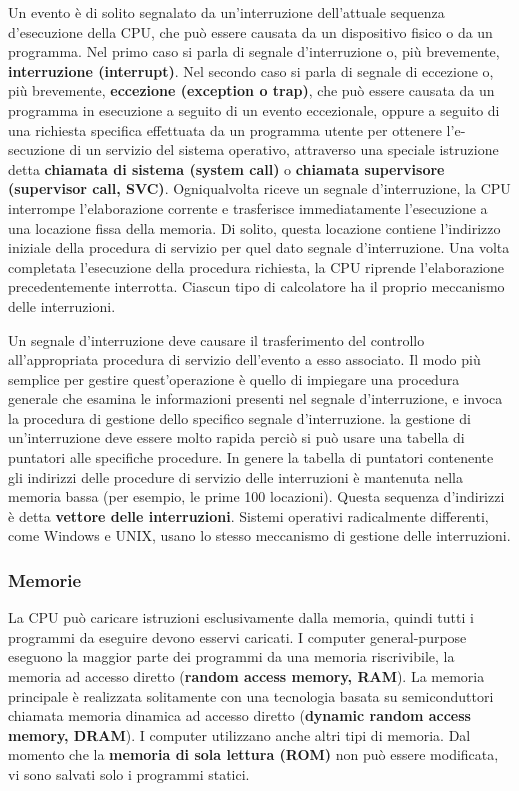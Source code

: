 \documentclass[11pt,a4paper]{article}
\begin{document}
Un evento è di solito segnalato da un'interruzione dell'attuale sequenza d'esecuzione
della CPU, che può essere causata da un dispositivo fisico o da un programma. Nel primo
ca­so si parla di segnale d'interruzione o, più brevemente, \textbf{interruzione (interrupt)}.
Nel secondo caso si parla di segnale di eccezione
o, più brevemente, \textbf{eccezione (exception o trap)}, che può essere causata da un programma in
esecuzione a seguito di un evento eccezionale,
op­pure a seguito di una richiesta specifica effettuata da un programma utente per ottenere
l'e­secuzione di un servizio del sistema operativo, attraverso una speciale istruzione detta
\textbf{chia­mata di sistema (system call)} o \textbf{chiamata supervisore (supervisor call, SVC)}.
Ogniqualvolta riceve un segnale d'interruzione, la CPU interrompe l'elaborazione
cor­rente e trasferisce immediatamente l'esecuzione a una locazione fissa della memoria. Di
so­lito, questa locazione contiene l'indirizzo iniziale della procedura di servizio per quel dato
segnale d'interruzione. Una volta completata l'esecuzione della procedura richiesta, la CPU
riprende l'elaborazione precedentemente interrotta. Ciascun tipo di calcolatore ha il proprio meccanismo delle interruzioni.

Un segnale d'interruzione deve causare il trasferimento
del controllo all'appropriata procedura di servizio dell'evento a esso associato. Il modo più
semplice per gestire quest'operazione è quello di impiegare una procedura generale che
esa­mina le informazioni presenti nel segnale d'interruzione, e invoca la procedura di gestione
dello specifico segnale d'interruzione. la gestione di un'interruzione deve
esse­re molto rapida perciò si può usare una tabella di puntatori alle specifiche procedure.
In genere la tabella di puntatori
contenen­te gli indirizzi delle procedure di servizio delle interruzioni è mantenuta nella memoria
bas­sa (per esempio, le prime 100 locazioni). Questa sequenza d'indirizzi è detta
\textbf{vetto­re delle interruzioni}. Sistemi operativi radicalmente differenti, come Windows e
UNIX, usano lo stesso meccanismo di gestione delle interruzioni.

\subsubsection{Memorie}
La CPU può caricare istruzioni esclusivamente dalla memoria, quindi tutti i programmi da
eseguire devono esservi caricati. I computer general-purpose eseguono la maggior parte dei
programmi da una memoria riscrivibile, la  memoria
ad accesso diretto (\textbf{random access memory, RAM}). La memoria principale è realizzata solita­mente con una tecnologia basata su semiconduttori chiamata memoria dinamica ad
acces­so diretto (\textbf{dynamic random access memory, DRAM}). I computer utilizzano anche altri tipi di
memoria. Dal momento che la \textbf{memoria di sola lettura (ROM)} non può essere modificata,
vi sono salvati solo i programmi statici.
\end{document}
